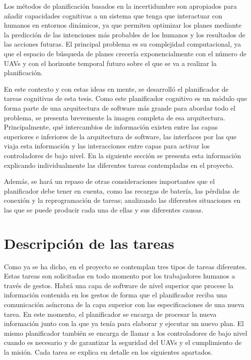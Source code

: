 \documentclass[fontsize=11pt, English=false, Español=true, Myfinal=true, twoside, numbers=noenddot]{scrbook}
\begin{document}
{Los métodos de planificación basados en la incertidumbre son apropiados para añadir capacidades cognitivas a un sistema que tenga que interactuar con humanos en entornos dinámicos, ya que permiten optimizar los planes mediante la predicción de las intenciones más probables de los humanos y los resultados de las acciones futuras. El principal problema es su complejidad computacional, ya que el espacio de búsqueda de planes crecería exponencialmente con el número de \glspl{UAV} y con el horizonte temporal futuro sobre el que se va a realizar la planificación.

En este contexto y con estas ideas en mente, se desarrolló el planificador de tareas cognitivas de esta tesis. Como este planificador cognitivo es un módulo que forma parte de una arquitectura de software más grande para abordar todo el problema, se presenta brevemente la imagen completa de esa arquitectura. Principalmente, qué intercambios de información existen entre las capas superiores e inferiores de la arquitectura de software, las interfaces por las que viaja esta información y las interacciones entre capas para activar los controladores de bajo nivel. En la siguiente sección se presenta esta información explicando individualmente las diferentes tareas contempladas en el proyecto. 

Además, se hará un repaso de otras consideraciones importantes que el planificador debe tener en cuenta, como las recargas de batería, las pérdidas de conexión y la reprogramación de tareas; analizando las diferentes situaciones en las que se puede producir cada una de ellas y sus diferentes causas. 

\section{Descripción de las tareas}
\label{sec:DescriptionOfTasks}
Como ya se ha dicho, en el proyecto se contemplan tres tipos de tareas diferentes. Estas tareas son solicitadas en todo momento por los trabajadores humanos a través de gestos. Habrá una capa de software de nivel superior que procese la información contenida en los gestos de forma que el planificador reciba una comunicación asíncrona de la capa superior con las especificaciones de una nueva tarea. En este momento, el planificador se encarga de procesar la nueva información junto con la que ya tenía para elaborar y ejecutar un nuevo plan. El mismo planificador también se encarga de llamar a los controladores de bajo nivel cuando es necesario y de garantizar la seguridad del \glspl{UAV} y el cumplimiento de la misión. Cada tarea se explica en detalle en los siguientes apartados.

}
\end{document}
